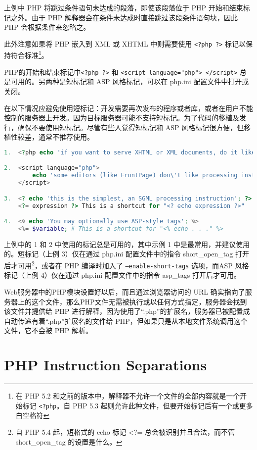 上例中 PHP 将跳过条件语句未达成的段落，即使该段落位于 PHP 开始和结束标记之外。由于 PHP 解释器会在条件未达成时直接跳过该段条件语句块，因此 PHP 会根据条件来忽略之。

此外注意如果将 PHP 嵌入到 XML 或 XHTML 中则需要使用 \texttt{<?php ?>} 标记以保持符合标准\footnote{在 PHP 5.2 和之前的版本中，解释器不允许一个文件的全部内容就是一个开始标记 \texttt{<?php}。自 PHP 5.3 起则允许此种文件，但要开始标记后有一个或更多白空格符}。

PHP的开始和结束标记中\texttt{<?php ?>} 和 \texttt{<script language="php"> </script>} 总是可用的。另两种是短标记和 ASP 风格标记，可以在 php.ini 配置文件中打开或关闭。

在以下情况应避免使用短标记：开发需要再次发布的程序或者库，或者在用户不能控制的服务器上开发。因为目标服务器可能不支持短标记。为了代码的移植及发行，确保不要使用短标记。尽管有些人觉得短标记和 ASP 风格标记很方便，但移植性较差，通常不推荐使用。

\begin{lstlisting}[language=PHP]
1.  <?php echo 'if you want to serve XHTML or XML documents, do it like this'; ?>

2.  <script language="php">
        echo 'some editors (like FrontPage) don\'t like processing instructions';
    </script>

3.  <? echo 'this is the simplest, an SGML processing instruction'; ?>
    <?= expression ?> This is a shortcut for "<? echo expression ?>"

4.  <% echo 'You may optionally use ASP-style tags'; %>
    <%= $variable; # This is a shortcut for "<% echo . . ." %>
\end{lstlisting}

上例中的 1 和 2 中使用的标记总是可用的，其中示例 1 中是最常用，并建议使用的。短标记（上例 3）仅在通过 php.ini 配置文件中的指令 short\_open\_tag 打开后才可用\footnote{自 PHP 5.4 起，短格式的 echo 标记 <?= 总会被识别并且合法，而不管 short\_open\_tag 的设置是什么。}，或者在 PHP 编译时加入了 \texttt{--enable-short-tags} 选项，而ASP 风格标记（上例 4）仅在通过 php.ini 配置文件中的指令 asp\_tags 打开后才可用。

Web服务器中的PHP模块设置好以后，而且通过浏览器访问的 URL 确实指向了服务器上的这个文件，那么PHP文件无需被执行或以任何方式指定，服务器会找到该文件并提供给 PHP 进行解释，因为使用了“.php”的扩展名，服务器已被配置成自动传递有着“.php”扩展名的文件给 PHP，但如果只是从本地文件系统调用这个文件，它不会被 PHP 解析。



\section{PHP Instruction Separations}

